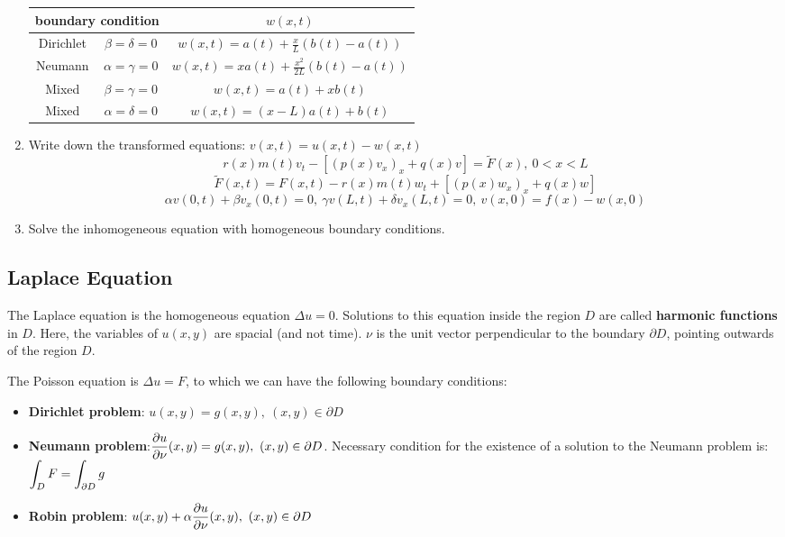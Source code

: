 \documentclass[a4paper]{article}
\begin{document}
\begin{twocolumn}
\begin{enumerate}
	\begin{tabular}{ccc}
		\multicolumn{2}{c}{boundary condition} & $w(x,t)$ \\ \midrule
		Dirichlet & $\beta = \delta = 0$ & $w(x,t) = a(t) + \frac{x}{L} \left(b(t) - a(t)\right)$ \\
		Neumann & $\alpha = \gamma = 0$ & $w(x,t) = x a(t) + \frac{x^2}{2L} \left( b(t) - a(t) \right)$ \\
		Mixed & $\beta = \gamma = 0$ & $w(x,t) = a(t) + xb(t)$ \\
		Mixed & $\alpha = \delta = 0$ & $w(x,t) = (x-L)a(t) + b(t)$ \\
	\end{tabular}
	\item Write down the transformed equations: $v(x,t) = u(x,t) - w(x,t)$
	$$r(x) m(t) v_t - \left[ (p(x) v_x)_x + q(x) v \right] = \tilde F(x), \ 0 < x < L$$
	$$\tilde F(x,t) = F(x,t) - r(x) m(t) w_t + \left[ (p(x)w_x)_x + q(x) w \right]$$
	$$\alpha v(0,t) + \beta v_x(0,t) = 0, \ \gamma v(L,t) + \delta v_x(L,t) = 0, \ v(x,0) = f(x) - w(x,0)$$
	\item Solve the inhomogeneous equation with homogeneous boundary conditions.
\end{enumerate}


\subsection{Laplace Equation}

The Laplace equation is the homogeneous equation $\Delta u = 0$. Solutions to this equation inside the region $D$ are called \textbf{harmonic functions} in $D$. Here, the variables of $u(x,y)$ are spacial (and not time). $\nu$ is the unit vector perpendicular to the boundary $\partial D$, pointing outwards of the region $D$.

The Poisson equation is $\Delta u = F$, to which we can have the following boundary conditions:

\begin{itemize}
	\item \textbf{Dirichlet problem}: $u(x,y) = g(x,y), \ (x,y) \in \partial D$
	\item \textbf{Neumann problem}:$\displaystyle \frac{\partial u}{\partial \nu} (x,y) = g(x,y), \ (x,y) \in \partial D$. Necessary condition for the existence of a solution to the Neumann problem is: $\displaystyle \int_D F = \int_{\partial D} g$
	\item \textbf{Robin problem}: $\displaystyle u(x,y) + \alpha \frac{\partial u}{\partial \nu}(x,y), \ (x,y) \in \partial D$ 
\end{itemize}


\end{twocolumn}
\end{document}
